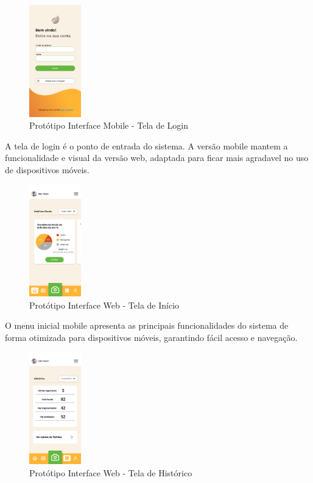 
\begin{figure}[H]
\centering
\caption{Protótipo Interface Mobile - Tela de Login}
\label{fig:interface-mobile-tela-login}
\includegraphics[width=0.2\textwidth]{Images/MobileLogin.png}
\end{figure}

A tela de login é o ponto de entrada do sistema. A versão mobile mantem a
funcionalidade e visual da versão web, adaptada para ficar mais agradavel no uso 
de dispositivos móveis.
\medskip


\begin{figure}[H]
\centering
\caption{Protótipo Interface Web - Tela de Início}
\label{fig:interface-web-tela-inicio}
\includegraphics[width=0.2\textwidth]{Images/MobileInicio.png}
\end{figure}

O menu inicial mobile apresenta as principais funcionalidades do sistema de forma
otimizada para dispositivos móveis, garantindo fácil acesso e navegação.
\medskip



\begin{figure}[H]
\centering
\caption{Protótipo Interface Web - Tela de Histórico}
\label{fig:interface-web-telahistorico-1}
\includegraphics[width=0.2\textwidth]{Images/MobileHistorico.png}
\end{figure}


